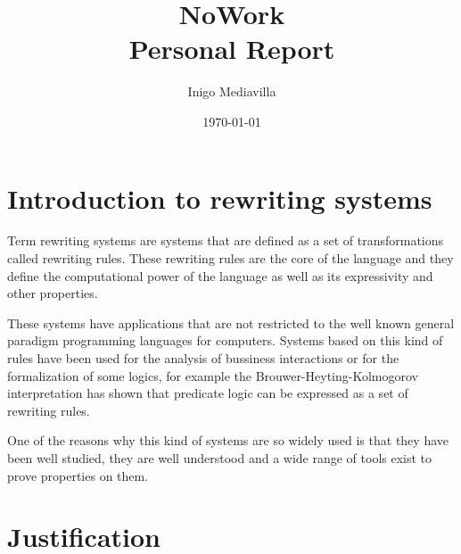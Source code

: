 \documentclass[12pt,a4paper]{article}
\title{NoWork\\ Personal Report}
\author{Inigo Mediavilla\\[2em]}
\date\today
\begin{document}
\maketitle


\section{Introduction to rewriting systems}

Term rewriting systems are systems that  are defined as a set of transformations called
rewriting rules. These rewriting rules are the core of the language and
they define the computational power of the language as well as
its expressivity and other properties.

 These systems have applications that are not
restricted to the well known general paradigm programming languages
for computers. Systems based on this kind of rules have been used for
the analysis of bussiness interactions or for the formalization of
some logics, for example the Brouwer-Heyting-Kolmogorov interpretation has shown that
predicate logic can be expressed as a set of rewriting rules.

One of the reasons why this kind of systems are so widely used is that
they have been well studied, they are well understood and a
wide range of tools exist to prove properties on them.

\section{Justification}
\end{document}
